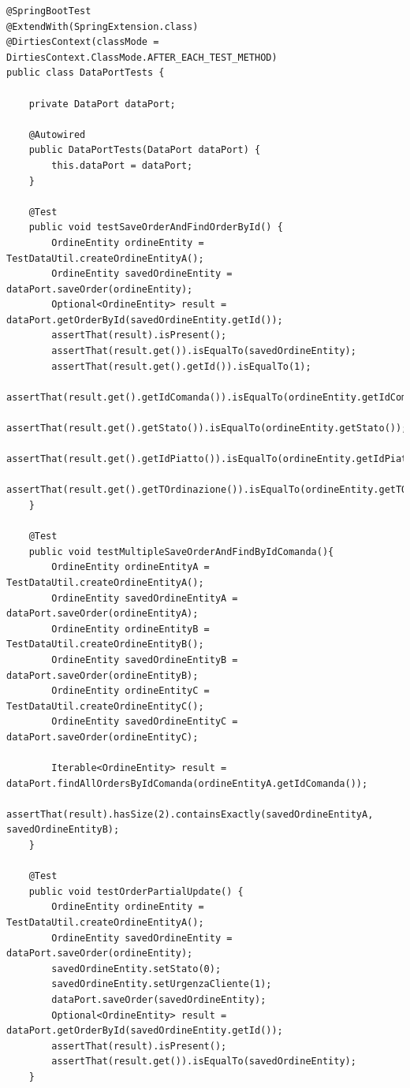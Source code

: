 \begin{lstlisting}[style=myJava, 
    caption={Classe adattatore JPA JPADBAdapter.java}, label=lst:DataPortTest, 
    emph={[2] dataPort, log, logger, AFTER_EACH_TEST_METHOD},
    emphstyle={[2]\color{codeDarkMagenta}},
    emph={[3] testSaveOrderAndFindOrderById, testMultipleSaveOrderAndFindByIdComanda, testOrderPartialUpdate, testDeleteOrder },
    emphstyle={[3]\color{codeCyan}},]
@SpringBootTest
@ExtendWith(SpringExtension.class)
@DirtiesContext(classMode = DirtiesContext.ClassMode.AFTER_EACH_TEST_METHOD)
public class DataPortTests {

    private DataPort dataPort;

    @Autowired
    public DataPortTests(DataPort dataPort) {
        this.dataPort = dataPort;
    }

    @Test
    public void testSaveOrderAndFindOrderById() {
        OrdineEntity ordineEntity = TestDataUtil.createOrdineEntityA();
        OrdineEntity savedOrdineEntity = dataPort.saveOrder(ordineEntity);
        Optional<OrdineEntity> result = dataPort.getOrderById(savedOrdineEntity.getId());
        assertThat(result).isPresent();
        assertThat(result.get()).isEqualTo(savedOrdineEntity);
        assertThat(result.get().getId()).isEqualTo(1);
        assertThat(result.get().getIdComanda()).isEqualTo(ordineEntity.getIdComanda());
        assertThat(result.get().getStato()).isEqualTo(ordineEntity.getStato());
        assertThat(result.get().getIdPiatto()).isEqualTo(ordineEntity.getIdPiatto());
        assertThat(result.get().getTOrdinazione()).isEqualTo(ordineEntity.getTOrdinazione());
    }

    @Test
    public void testMultipleSaveOrderAndFindByIdComanda(){
        OrdineEntity ordineEntityA = TestDataUtil.createOrdineEntityA();
        OrdineEntity savedOrdineEntityA = dataPort.saveOrder(ordineEntityA);
        OrdineEntity ordineEntityB = TestDataUtil.createOrdineEntityB();
        OrdineEntity savedOrdineEntityB = dataPort.saveOrder(ordineEntityB);
        OrdineEntity ordineEntityC = TestDataUtil.createOrdineEntityC();
        OrdineEntity savedOrdineEntityC = dataPort.saveOrder(ordineEntityC);

        Iterable<OrdineEntity> result = dataPort.findAllOrdersByIdComanda(ordineEntityA.getIdComanda());
        assertThat(result).hasSize(2).containsExactly(savedOrdineEntityA, savedOrdineEntityB);
    }

    @Test
    public void testOrderPartialUpdate() {
        OrdineEntity ordineEntity = TestDataUtil.createOrdineEntityA();
        OrdineEntity savedOrdineEntity = dataPort.saveOrder(ordineEntity);
        savedOrdineEntity.setStato(0);
        savedOrdineEntity.setUrgenzaCliente(1);
        dataPort.saveOrder(savedOrdineEntity);
        Optional<OrdineEntity> result = dataPort.getOrderById(savedOrdineEntity.getId());
        assertThat(result).isPresent();
        assertThat(result.get()).isEqualTo(savedOrdineEntity);
    }


\end{lstlisting}
